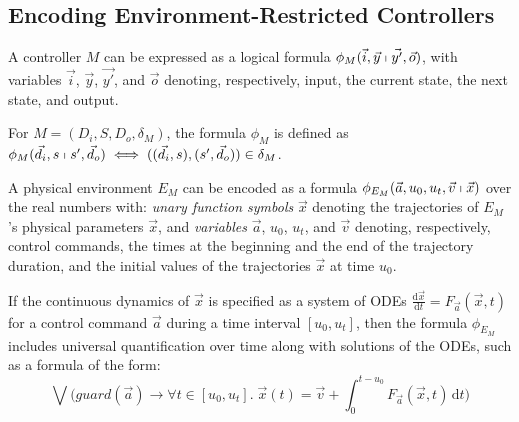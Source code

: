 \subsection{Encoding Environment-Restricted Controllers}
\label{sec:discrete-encoding}

A controller $M$ can be 
expressed as a logical formula %
$\phi_M(\vec{i}, \vec{y} \shortmid \vec{y'}, \vec{o})$,
with variables
$\vec{i}$, $\vec{y}$, $\vec{y'}$, and $\vec{o}$  denoting,
respectively,  input, 
 the current state, 
 the next state, and output.

\begin{definition}
For  $M = (D_i,S,D_o,\delta_M)$,
the formula $\phi_M$ is defined as
$\phi_{M}(\vec{d}_i, s \shortmid s',  \vec{d}_o)
\iff
( (\vec{d}_i, s), (s', \vec{d}_o) ) \in \delta_{M}$.
\end{definition}



A physical environment $E_M$ can be encoded  as 
a formula $\phi_{E_M}(\vec{a},u_0,u_t,\vec{v} \shortmid \vec{x})$  over the real numbers %
with: \emph{unary function symbols} $\vec{x}$ denoting the
trajectories of $E_M$'s physical parameters $\vec{x}$, and 
	\emph{variables} $\vec{a}$, $u_0$, $u_t$, and $\vec{v}$
        denoting, respectively,  control commands, %
		 the 
		times at the beginning and the end of the trajectory duration, and 
		the  initial values of the trajectories $\vec{x}$ at time $u_0$.


If the continuous dynamics of $\vec{x}$ is specified as a system of ODEs
$\frac{\mathrm{d}\vec{x}}{\mathrm{d}t}= F_{\vec{a}}(\vec{x},t)$
for a control command $\vec{a}$
during a time interval $[u_0,u_t]$, 
then the formula $\phi_{E_M}$ 
includes universal quantification over time along with solutions of the ODEs, such as a formula of the form:
\[
\bigvee \big(\mathit{guard}(\vec{a}) \rightarrow
\forall t \in [u_0,u_t].\;
\vec{x}(t) = \vec{v} + \int_0^{t-u_0} \!  F_{\vec{a}}(\vec{x},t)\,\mathrm{d}t
\big)
\]


